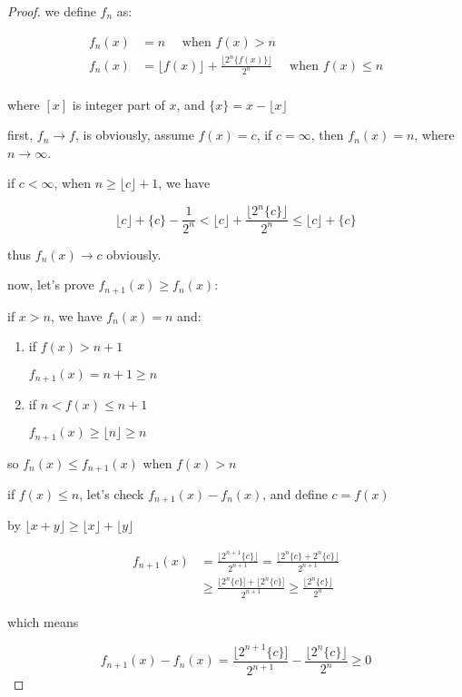 \begin{proof}
   we define $f_n$ as:

   \begin{align*}
    f_n(x) & = n  \quad \text{ when } f(x) > n \\
    f_n(x) & = \lfloor f(x) \rfloor + \frac{\lfloor2^n \{ f(x) \} \rfloor}{2^n}  \quad \text{ when } f(x) \le n \\
   \end{align*}
   
   where $[x]$ is integer part of $x$, and $\{x\} = x - \lfloor x \rfloor$

   first, $f_n \to f$, is obviously, assume $f(x) = c$, if $c = \infty$, then $f_n(x) = n$, where $n \to \infty$.

   if $c < \infty$, when $n \ge \lfloor c \rfloor + 1$, we have 
   
   \[
 \lfloor c \rfloor + \{ c \} - \frac{1}{2^n} < \lfloor c \rfloor + \frac{\lfloor 2^n \{ c \} \rfloor}{2^n} \le \lfloor c \rfloor + \{ c \}
   \]

   thus $f_n(x) \to c$ obviously.

   now, let's prove $f_{n+1}(x) \ge f_n(x)$:
   
   if $x > n$, we have $f_{n}(x) = n$ and:
   
   \begin{enumerate}
    \item if $f(x) > n+1$

    $f_{n+1}(x) = n+1 \ge n$

    \item if $n < f(x) \le n+1$

    $f_{n+1}(x) \ge \lfloor n \rfloor \ge n$ 
   \end{enumerate}

   so $f_n(x) \le f_{n+1}(x)$ when $f(x) > n$

   if $f(x) \le n$, let's check $f_{n+1}(x) - f_n(x)$, and define $c = f(x)$

   by $\lfloor x+y \rfloor \ge \lfloor x \rfloor + \lfloor y \rfloor$

   \begin{align*}
    f_{n+1}(x) &=  \frac{\lfloor 2^{n+1} \{ c \}\rfloor}{2^{n+1}} = \frac{\lfloor 2^{n} \{ c \} + 2^{n} \{ c \}\rfloor}{2^{n+1}} \\
    & \ge\frac{\lfloor 2^{n} \{ c \}] + \lfloor 2^{n} \{ c \}]}{2^{n+1}} \ge \frac{\lfloor 2^{n} \{ c \}\rfloor}{2^{n}}
   \end{align*}

   which means 
   
   \[
   f_{n+1}(x) -  f_n(x) = \frac{\lfloor 2^{n+1} \{ c \}  ]}{2^{n+1}}- \frac{\lfloor 2^{n} \{ c \}\rfloor}{2^{n}} \ge 0
   \]
\end{proof}


